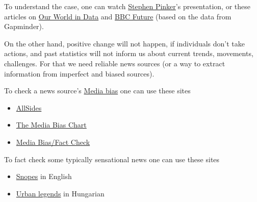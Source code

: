 \documentclass{article}
\begin{document}
To understand the case, one can watch \href{https://www.ted.com/talks/steven_pinker_is_the_world_getting_better_or_worse_a_look_at_the_numbers}{Stephen Pinker}'s presentation, or these articles on \href{https://ourworldindata.org/wrong-about-the-world}{Our World in Data} and \href{https://www.bbc.com/future/article/20190111-seven-reasons-why-the-world-is-improving}{BBC Future} (based on the data from Gapminder).

On the other hand, positive change will not happen, if individuals don't take actions, and past statistics will not inform us about current trends, movements, challenges. For that we need reliable news sources (or a way to extract information from imperfect and biased sources).

To check a news source's \href{https://en.wikipedia.org/wiki/Media_bias}{Media bias} one can use these sites
\begin{itemize}
    \item \href{https://www.allsides.com/media-bias/media-bias-chart}{AllSides}
    \item \href{https://www.adfontesmedia.com/intro-to-the-media-bias-chart/}{The Media Bias Chart}
    \item \href{https://mediabiasfactcheck.com}{Media Bias/Fact Check}
\end{itemize}

To fact check some typically sensational news one can use these sites
\begin{itemize}
    \item \href{https://www.snopes.com/}{Snopes} in English
    \item \href{https://www.urbanlegends.hu/}{Urban legends} in Hungarian
\end{itemize}
\end{document}
